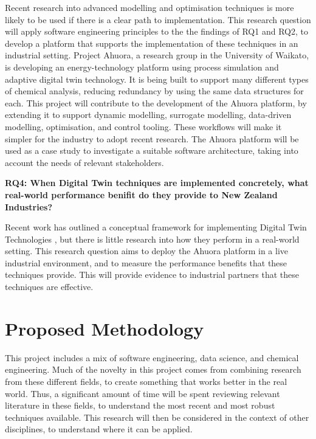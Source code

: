 \documentclass[12pt]{article}
\begin{document}
Recent research into advanced modelling and optimisation techniques is more likely to be used if there is a clear path to implementation. This research question will apply software engineering principles to the the findings of RQ1 and RQ2, to develop a platform that supports the implementation of these techniques in an industrial setting. Project Ahuora, a research group in the University of Waikato, is developing an energy-technology platform using process simulation and adaptive digital twin technology. It is being built to support many different types of chemical analysis, reducing redundancy by using the same data structures for each. This project will contribute to the development of the Ahuora platform, by extending it to support dynamic modelling, surrogate modelling, data-driven modelling, optimisation, and control tooling. These workflows will make it simpler for the industry to adopt recent research. The Ahuora platform will be used as a case study to investigate a suitable software architecture, taking into account the needs of relevant stakeholders.

\textbf{RQ4: When Digital Twin techniques are implemented concretely, what real-world performance benifit do they provide to New Zealand Industries?}

Recent work has outlined a conceptual framework for implementing Digital Twin Technologies \cite{ors2020conceptual}, but there is little research into how they perform in a real-world setting. This research question aims to deploy the Ahuora platform in a live industrial environment, and to measure the performance benefits that these techniques provide. This will provide evidence to industrial partners that these techniques are effective. 


\section{Proposed Methodology}

% 

This project includes a mix of software engineering, data science, and chemical engineering. Much of the novelty in this project comes from combining research from these different fields, to create something that works better in the real world. Thus, a significant amount of time will be spent reviewing relevant literature in these fields, to understand the most recent and most robust techniques available. This research will then be considered in the context of other disciplines, to understand where it can be applied.
\end{document}
